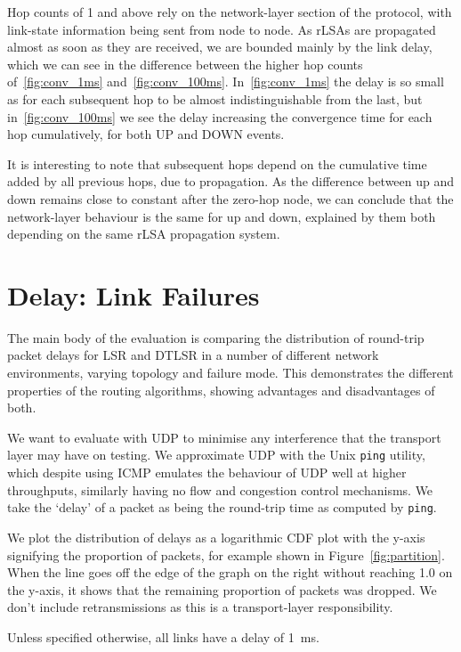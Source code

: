 \documentclass[withindex,glossary,openany]{cam-thesis}
\begin{document}
Hop counts of 1 and above rely on the network-layer section of the protocol, with link-state information being sent from node to node. As rLSAs are propagated almost as soon as they are received, we are bounded mainly by the link delay, which we can see in the difference between the higher hop counts of~\ref{fig:conv_1ms} and~\ref{fig:conv_100ms}. In~\ref{fig:conv_1ms} the delay is so small as for each subsequent hop to be almost indistinguishable from the last, but in~\ref{fig:conv_100ms} we see the delay increasing the convergence time for each hop cumulatively, for both UP and DOWN events.

It is interesting to note that subsequent hops depend on the cumulative time added by all previous hops, due to propagation. As the difference between up and down remains close to constant after the zero-hop node, we can conclude that the network-layer behaviour is the same for up and down, explained by them both depending on the same rLSA propagation system.


\section{Delay: Link Failures}

The main body of the evaluation is comparing the distribution of round-trip packet delays for LSR and DTLSR in a number of different network environments, varying topology and failure mode. This demonstrates the different properties of the routing algorithms, showing advantages and disadvantages of both.

We want to evaluate with UDP to minimise any interference that the transport layer may have on testing. We approximate UDP with the Unix \texttt{ping} utility, which despite using ICMP emulates the behaviour of UDP well at higher throughputs, similarly having no flow and congestion control mechanisms. We take the `delay' of a packet as being the round-trip time as computed by \texttt{ping}.

We plot the distribution of delays as a logarithmic CDF plot with the y-axis signifying the proportion of packets, for example shown in Figure~\ref{fig:partition}. When the line goes off the edge of the graph on the right without reaching 1.0 on the y-axis, it shows that the remaining proportion of packets was dropped. We don't include retransmissions as this is a transport-layer responsibility.

Unless specified otherwise, all links have a delay of \SI{1}{\ms}.
\end{document}
